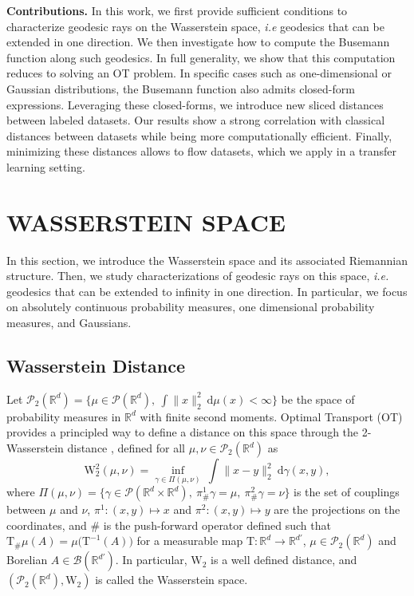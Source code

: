 \documentclass[twoside]{article}
\newcommand{\cP}{\mathcal{P}}
\newcommand{\W}{\mathrm{W}}
\newcommand{\R}{\mathbb{R}}
\newcommand{\T}{\mathrm{T}}
\begin{document}
\textbf{Contributions.}  In this work, we first provide sufficient conditions to characterize geodesic rays on the Wasserstein space, \emph{i.e} geodesics that can be extended in one direction. We then investigate how to compute the Busemann function along such geodesics. In full generality, we show that this computation reduces to solving an OT problem. In specific cases such as one-dimensional or Gaussian distributions, the Busemann function also admits closed-form expressions. Leveraging these closed-forms, we introduce new sliced distances between labeled datasets. Our results show a strong correlation with classical distances between datasets while being more computationally efficient. Finally, minimizing these distances allows to flow datasets, which we apply in a transfer learning setting. 



\section{WASSERSTEIN SPACE} \label{section:geodesic_rays}

 In this section, we introduce the Wasserstein space and its associated Riemannian structure. Then, we study characterizations of geodesic rays on this space, \emph{i.e.} geodesics that can be extended to infinity in one direction. In particular, we focus on absolutely continuous probability measures, one dimensional probability measures, and Gaussians.

\subsection{Wasserstein Distance}

Let $\cP_2(\R^d) = \{\mu\in \cP(\R^d),\ \int \|x\|_2^2\ \mathrm{d}\mu(x)<\infty\}$ be the space of probability measures in $\R^d$ with finite second moments. Optimal Transport (OT) provides a principled way to define a distance on this space through the 2-Wasserstein distance \citep{villani2009optimal}, defined for all $\mu,\nu\in\cP_2(\R^d)$ as
\begin{equation} \label{eq:w_dist}
    \W_2^2(\mu,\nu) = \inf_{\gamma\in\Pi(\mu,\nu)}\ \int\|x-y\|_2^2\ \mathrm{d}\gamma(x,y),
\end{equation}
 where $\Pi(\mu,\nu) = \{\gamma\in \mathcal{P}(\mathbb{R}^d\times \mathbb{R}^d),\ \pi^1_\#\gamma=\mu,\ \pi^2_\#\gamma=\nu\}$ is the set of couplings between $\mu$ and $\nu$, $\pi^1:(x,y)\mapsto x$ and $\pi^2:(x,y)\mapsto y$ are the projections on the coordinates, and $\#$ is the push-forward operator defined such that $\T_\#\mu(A)=\mu\big( \T^{-1}(A)\big)$ for a measurable map $\T:\R^d\to\R^{d'}$, $\mu\in\cP_2(\R^d)$ and Borelian $A\in\mathcal{B}(\R^{d'})$. In particular, $\W_2$ is a well defined distance, and $(\cP_2(\R^d),\W_2)$ is called the Wasserstein space. 
\end{document}
